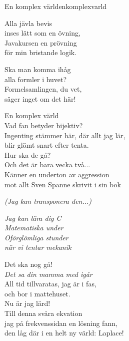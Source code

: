 \begin{song}{En komplex värld}{enkomplexvarld}
    \begin{vers}
        Alla jävla bevis\\
        inses lätt som en övning,\\
        Javakursen en prövning\\
        för min bristande logik.\\
    \end{vers}
    \newp
    \begin{vers}
        Ska man komma ihåg\\
        alla formler i huvet?\\
        Formelsamlingen, du vet,\\
        säger inget om det här!\\
    \end{vers}
    \newp
    \begin{vers}
        En komplex värld\\
        Vad fan betyder bijektiv?\\
        Ingenting stämmer här, där allt jag lär,\\
        blir glömt snart efter tenta.\\
        Hur ska de gå?\\
        Och det är bara vecka två...\\
        Känner en underton av aggression\\
        mot allt Sven Spanne skrivit i sin bok\\
    \end{vers}
    \newp
    \begin{vers}
        \emph{(Jag kan transponera den...)}\\
    \end{vers}
    \newp
    \begin{vers}
        \emph{Jag kan lära dig C}\\
        \emph{Matematiska under}\\
        \emph{Oförglömliga stunder}\\
        \emph{när vi tentar mekanik}\\
    \end{vers}
    \newp
    \begin{vers}
        Det ska nog gå!\\
        \emph{Det sa din mamma med igår}\\
        All tid tillvaratas, jag är i fas,\\
        och bor i mattehuset.\\
        Nu är jag lärd!\\
        Till denna svåra ekvation\\
        jag på frekvenssidan en lösning fann, \\
        den låg där i en helt ny värld: Laplace!\\
    \end{vers}
\end{song}
    









